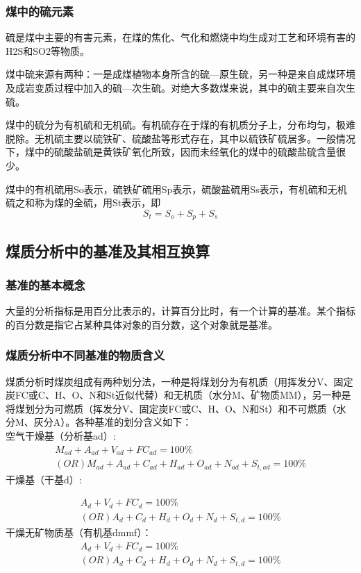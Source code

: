 \documentclass[10pt,openany]{ctexbook}
\begin{document}
\subsubsection{煤中的硫元素} 硫是煤中主要的有害元素，在煤的焦化、气化和燃烧中均生成对工艺和环境有害的H2S和SO2等物质。\par
    煤中硫来源有两种：一是成煤植物本身所含的硫—原生硫，另一种是来自成煤环境及成岩变质过程中加入的硫—次生硫。对绝大多数煤来说，其中的硫主要来自次生硫。\par
 煤中的硫分为有机硫和无机硫。有机硫存在于煤的有机质分子上，分布均匀，极难脱除。无机硫主要以硫铁矿、硫酸盐等形式存在，其中以硫铁矿硫居多。一般情况下，煤中的硫酸盐硫是黄铁矿氧化所致，因而未经氧化的煤中的硫酸盐硫含量很少。\par
    煤中的有机硫用So表示，硫铁矿硫用Sp表示，硫酸盐硫用Ss表示，有机硫和无机硫之和称为煤的全硫，用St表示，即$$S_t=S_o+S_p+S_s$$

\subsection{煤质分析中的基准及其相互换算}
\subsubsection{基准的基本概念} 大量的分析指标是用百分比表示的，计算百分比时，有一个计算的基准。某个指标的百分数是指它占某种具体对象的百分数，这个对象就是基准。
\subsubsection{煤质分析中不同基准的物质含义}
煤质分析时煤炭组成有两种划分法，一种是将煤划分为有机质（用挥发分V、固定炭FC或C、H、O、N和St近似代替）和无机质（水分M、矿物质MM），另一种是将煤划分为可燃质（挥发分V、固定炭FC或C、H、O、N和St）和不可燃质（水分M、灰分A）。各种基准的划分含义如下：    \\
空气干燥基（分析基ad）:
\begin{eqnarray}
 M_{ad}+A_{ad}+V_{ad}+FC_{ad}=100\%  \\(OR)
 M_{ad}+A_{ad}+C_{ad}+H_{ad}+O_{ad}+N_{ad}+S_{t,ad}=100\%
\end{eqnarray}
干燥基（干基d）:

\begin{eqnarray}
A_d+V_d+FC_d=100 \%  \\ (OR)
A_d+C_d+H_d+O_d+N_d+S_{t,d}=100\%
\end{eqnarray}
干燥无矿物质基（有机基dmmf）：
\begin{eqnarray}
A_d+V_d+FC_d=100 \%  \\ (OR)
A_d+C_d+H_d+O_d+N_d+S_{t,d}=100\%
\end{eqnarray}
\end{document}
